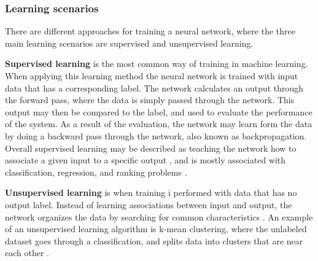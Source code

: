 


\subsubsection{Learning scenarios}
There are different approaches for training a neural network, where the three main learning scenarios are supervised and unsupervised learning.

\noindent
\textbf{Supervised learning} is the most common way of training in machine learning. When applying this learning method the neural network is trained with input data that has a corresponding label. The network calculates an output through the forward pass, where the data is simply passed through the network. This output may then be compared to the label, and used to evaluate the performance of the system. As a result of the evaluation, the network may learn form the data by doing a backward pass through the network, also known as backpropagation. \citep{LeCun2015} Overall supervised learning may be described as teaching the network how to associate a given input to a specific output \citep{Goodfellow0216}, and is mostly associated with classification, regression, and ranking problems \citep{Mehryar2012}.

\noindent
\textbf{Unsupervised learning} is when training i performed with data that has no output label. Instead of learning associations between input and output, the network organizes the data by searching for common characteristics \citep{Mehryar2012}. An example of an unsupervised learning algorithm is k-mean clustering, where the unlabeled dataset goes through a classification, and splits data into clusters that are near each other \citep{Goodfellow2016}.  


